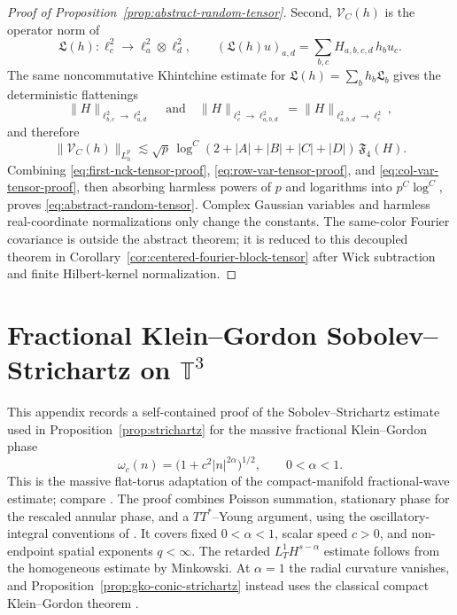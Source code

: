 \documentclass[10pt]{amsart}
\numberwithin{equation}{section}
\theoremstyle{plain}
\theoremstyle{definition}
\theoremstyle{remark}
\begin{document}
\begin{proof}[Proof of Proposition~\ref{prop:abstract-random-tensor}]
Second, $\mathcal V_C(h)$ is the operator norm of
\[
\mathfrak L(h):\ell_c^2\to\ell_a^2\otimes\ell_d^2,
\qquad
(\mathfrak L(h)u)_{a,d}=\sum_{b,c}H_{a,b,c,d}\,h_bu_c.
\]
The same noncommutative Khintchine estimate for $\mathfrak L(h)=\sum_bh_b\mathfrak L_b$ gives the deterministic flattenings
\[
        \|H\|_{\ell^2_{b,c}\to\ell^2_{a,d}}
        \quad\text{and}\quad
        \|H\|_{\ell^2_c\to\ell^2_{a,b,d}}
        =\|H\|_{\ell^2_{a,b,d}\to\ell^2_c},
\]
and therefore
\begin{equation}\label{eq:col-var-tensor-proof}
        \|\mathcal V_C(h)\|_{L_h^p}
        \lesssim
        \sqrt p\,\log^C(2+|A|+|B|+|C|+|D|)\,\mathfrak F_4(H).
\end{equation}
Combining \eqref{eq:first-nck-tensor-proof}, \eqref{eq:row-var-tensor-proof}, and \eqref{eq:col-var-tensor-proof}, then absorbing harmless powers of $p$ and logarithms into $p^C\log^C$, proves \eqref{eq:abstract-random-tensor}.  Complex Gaussian variables and harmless real-coordinate normalizations only change the constants.  The same-color Fourier covariance is outside the abstract theorem; it is reduced to this decoupled theorem in Corollary~\ref{cor:centered-fourier-block-tensor} after Wick subtraction and finite Hilbert-kernel normalization.
\end{proof}

\section{Fractional Klein--Gordon Sobolev--Strichartz on \texorpdfstring{$\mathbb T^3$}{T3}}\label{app:fracKG-strichartz}

This appendix records a self-contained proof of the Sobolev--Strichartz estimate used in Proposition~\ref{prop:strichartz} for the massive fractional Klein--Gordon phase
\[
        \omega_c(n)=\bigl(1+c^2|n|^{2\alpha}\bigr)^{1/2},
        \qquad 0<\alpha<1.
\]
This is the massive flat-torus adaptation of the compact-manifold fractional-wave estimate; compare \cite{Dinh}.  The proof combines Poisson summation, stationary phase for the rescaled annular phase, and a \(TT^*\)--Young argument, using the oscillatory-integral conventions of \cite{SteinHarmonic,SoggeFIO}.  It covers fixed \(0<\alpha<1\), scalar speed \(c>0\), and non-endpoint spatial exponents \(q<\infty\).  The retarded \(L_T^1H^{s-\alpha}\) estimate follows from the homogeneous estimate by Minkowski.  At \(\alpha=1\) the radial curvature vanishes, and Proposition~\ref{prop:gko-conic-strichartz} instead uses the classical compact Klein--Gordon theorem \cite{CacciafestaDanesiMeng}.
\end{document}
